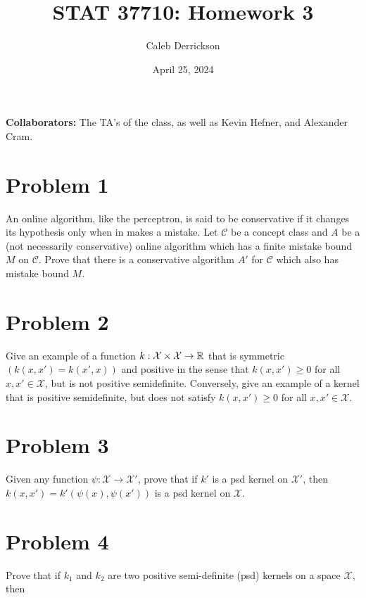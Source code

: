 

\title{STAT 37710: Homework 3}
\author{Caleb Derrickson}
\date{April 25, 2024}


\onehalfspacing
\maketitle
\allowdisplaybreaks
{\color{cit}\vspace{2mm}\noindent\textbf{Collaborators:}} The TA's of the class, as well as Kevin Hefner, and Alexander Cram.

\tableofcontents
\newcommand{\scC}{\mathcal{C}}
\newcommand{\scX}{\mathcal{X}}

\newpage
\section{Problem 1}
An online algorithm, like the perceptron, is said to be conservative if it changes its hypothesis only when in makes a mistake. Let $\scC$ be a concept class and $A$ be a (not necessarily conservative) online algorithm which has a finite mistake bound $M$ on $\scC$. Prove that there is a conservative algorithm $A'$ for $\scC$ which also has mistake bound $M$.

\newpage
\section{Problem 2}
Give an example of a function $k: \scX \times \scX \to \R$ that is symmetric $(k(x, x') = k(x', x))$ and positive in the sense that $k(x, x') \geq 0$ for all $x, x' \in \scX$, but is not positive semidefinite. Conversely, give an example of a kernel that is positive semidefinite, but does not satisfy $k(x, x') \geq 0$ for all $x, x' \in \scX$.

\newpage
\section{Problem 3}
Given any function $\psi: \scX \to \scX'$, prove that if $k'$ is a psd kernel on $\scX'$, then $k(x, x') = k'(\psi(x), \psi(x'))$ is a psd kernel on $\scX$.

\newpage
\section{Problem 4}
Prove that if $k_1$ and $k_2$ are two positive semi-definite (psd) kernels on a space $\scX$, then 
